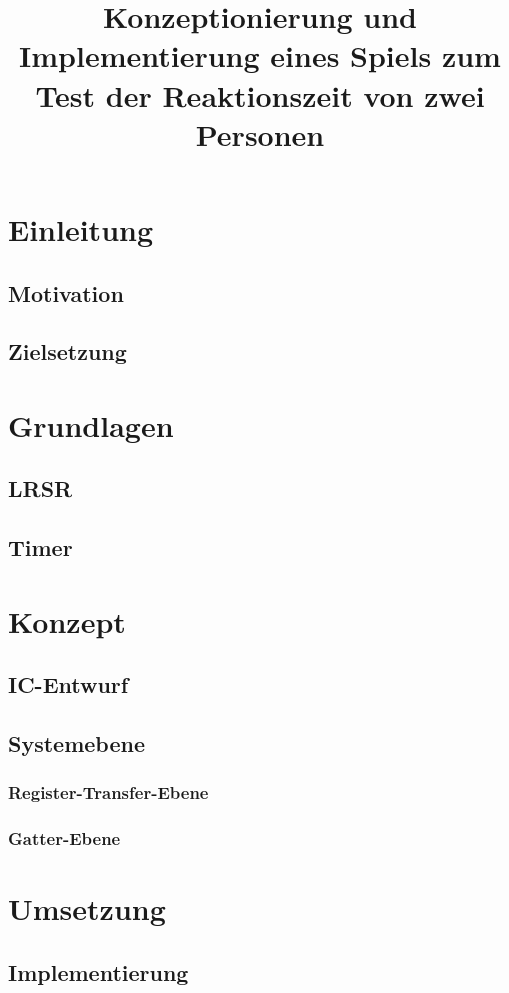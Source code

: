 \documentclass[]{report}
\title{Konzeptionierung und Implementierung eines Spiels zum Test der Reaktionszeit von zwei Personen}
\author{}
\begin{document}
\maketitle
\tableofcontents
\section{Einleitung}
\subsection{Motivation}
\subsection{Zielsetzung}

\section{Grundlagen}
\subsection{LRSR}
\subsection{Timer}

\section{Konzept}
\subsection{IC-Entwurf}
\subsection{Systemebene}
\subsubsection{Register-Transfer-Ebene}
\subsubsection{Gatter-Ebene}


\section{Umsetzung}
\subsection{Implementierung}
\


\begin{abstract}
\end{abstract}
\end{document}

